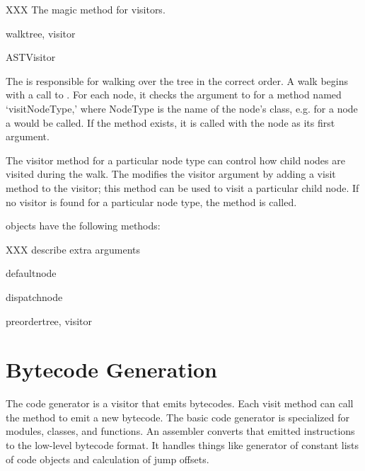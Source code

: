 XXX The magic  method for visitors.

\begin{funcdesc}{walk}{tree, visitor}
\end{funcdesc}

\begin{classdesc}{ASTVisitor}{}

The  is responsible for walking over the tree in the
correct order.  A walk begins with a call to .  For
each node, it checks the  argument to 
for a method named `visitNodeType,' where NodeType is the name of the
node's class, e.g. for a  node a 
would be called.  If the method exists, it is called with the node as
its first argument.

The visitor method for a particular node type can control how child
nodes are visited during the walk.  The  modifies
the visitor argument by adding a visit method to the visitor; this
method can be used to visit a particular child node.  If no visitor is
found for a particular node type, the  method is
called. 
\end{classdesc}

 objects have the following methods:

XXX describe extra arguments

\begin{methoddesc}{default}{node\optional{, \moreargs}}
\end{methoddesc}

\begin{methoddesc}{dispatch}{node\optional{, \moreargs}}
\end{methoddesc}

\begin{methoddesc}{preorder}{tree, visitor}
\end{methoddesc}


\section{Bytecode Generation}

The code generator is a visitor that emits bytecodes.  Each visit method
can call the  method to emit a new bytecode.  The basic
code generator is specialized for modules, classes, and functions.  An
assembler converts that emitted instructions to the low-level bytecode
format.  It handles things like generator of constant lists of code
objects and calculation of jump offsets.
